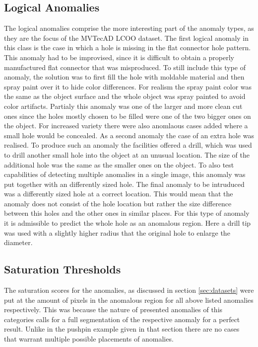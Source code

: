 \subsection{Logical Anomalies}
The logical anomalies comprise the more interesting part of the anomaly types, as they are the focus of the MVTecAD LCOO dataset. The first logical anomaly in this class is the case in which a hole 
is missing in the flat connector hole pattern. This anomaly had to be improvised, since it is difficult to obtain a properly manufactured flat connector that was misproduced. To still include 
this type of anomaly, the solution was to first fill the hole with moldable material and then spray paint over it to hide color differences. For realism the spray paint color was the same as the 
object surface and the whole object was spray painted to avoid color artifacts. Partialy this anomaly was one of the larger and more clean cut ones since the holes mostly chosen to be filled were one of the two 
bigger ones on the object. For increased variety there were also anomlaous cases added where a small hole would be concealed. As a second anomaly the case of an extra hole was realised. To produce such an anomaly the facilities offered a drill, which was used to drill another small hole into 
the object at an unusual location. The size of the additional hole was the same as the smaller ones on the object. To also test capabilities of detecting multiple anomalies in a single image, this anomaly 
was put together with an differently sized hole. The final anomaly to be intruduced was a differently sized hole at a correct 
location. This would mean that the anomaly does not consist of the hole location but rather the size difference between this holes and the other ones in similar places. For this type of anomaly it 
is admissible to predict the whole hole as an anomalous region.  %
Here a drill tip was used with a slightly higher radius that the original hole to enlarge the diameter.


\subsection{Saturation Thresholds}

The saturation scores for the anomalies, as discussed in section \ref{sec:datasets} were put at the amount of pixels in the anomalous region for all above listed anomalies respectively.
This was because the nature of presented anomalies of this categories calls for a full segmentation of the respective anomaly for a perfect result. Unlike in the pushpin example given in that section 
there are no cases that warrant multiple possible placements of anomalies.






